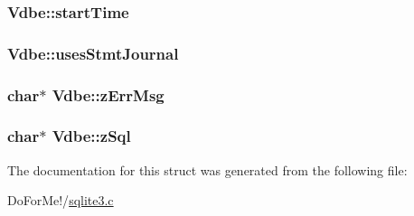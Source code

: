 \hypertarget{struct_vdbe_a1de76a5c58ed36608a163bfdc2e9e8b7}{
\subsubsection[{start\-Time}]{ Vdbe\-::start\-Time}}\label{struct_vdbe_a1de76a5c58ed36608a163bfdc2e9e8b7}
\hypertarget{struct_vdbe_aaac5176003bc8760200364c7752786a4}{
\subsubsection[{uses\-Stmt\-Journal}]{ Vdbe\-::uses\-Stmt\-Journal}}\label{struct_vdbe_aaac5176003bc8760200364c7752786a4}
\hypertarget{struct_vdbe_add7679059dd1e3cd483ddcb9153ca844}{
\subsubsection[{z\-Err\-Msg}]{\setlength{\rightskip}{0pt plus 5cm}char$\ast$ Vdbe\-::z\-Err\-Msg}}\label{struct_vdbe_add7679059dd1e3cd483ddcb9153ca844}
\hypertarget{struct_vdbe_a5a61fd8f84ae0399ef73327e48048ae9}{
\subsubsection[{z\-Sql}]{\setlength{\rightskip}{0pt plus 5cm}char$\ast$ Vdbe\-::z\-Sql}}\label{struct_vdbe_a5a61fd8f84ae0399ef73327e48048ae9}


The documentation for this struct was generated from the following file\-:\begin{DoxyCompactItemize}
\item 
Do\-For\-Me!/\hyperlink{sqlite3_8c}{sqlite3.\-c}\end{DoxyCompactItemize}
